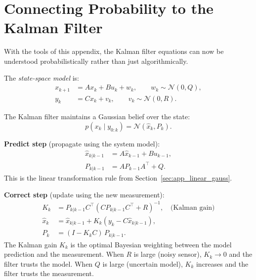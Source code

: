 \section{Connecting Probability to the Kalman Filter}
\label{sec:app_kalman_prob}

With the tools of this appendix, the Kalman filter equations can now
be understood probabilistically rather than just algorithmically.

The \emph{state-space model} is:
\begin{align*}
  {x}_{k+1} &= A{x}_k + B{u}_k + {w}_k,
  \qquad {w}_k \sim \mathcal{N}({0}, Q), \\
  {y}_k     &= C{x}_k + {v}_k,
  \qquad {v}_k \sim \mathcal{N}({0}, R).
\end{align*}

The Kalman filter maintains a Gaussian belief over the state:
\[
  p({x}_k \mid {y}_{0:k}) = \mathcal{N}(\hat{{x}}_k, P_k).
\]

\textbf{Predict step} (propagate using the system model):
\begin{align}
  \hat{{x}}_{k|k-1} &= A\hat{{x}}_{k-1} + B{u}_{k-1}, \\
  P_{k|k-1}                 &= A P_{k-1} A^\top + Q.
\end{align}
This is the linear transformation rule from
Section~\ref{sec:app_linear_gauss}.

\textbf{Correct step} (update using the new measurement):
\begin{align}
  K_k               &= P_{k|k-1} C^\top
                        (C P_{k|k-1} C^\top + R)^{-1},
                        \quad\text{(Kalman gain)} \\
  \hat{{x}}_k &= \hat{{x}}_{k|k-1}
                        + K_k({y}_k - C\hat{{x}}_{k|k-1}), \\
  P_k               &= (I - K_k C)\,P_{k|k-1}.
\end{align}
The Kalman gain $K_k$ is the optimal Bayesian weighting between the
model prediction and the measurement.  When $R$ is large (noisy
sensor), $K_k \to 0$ and the filter trusts the model.  When $Q$ is
large (uncertain model), $K_k$ increases and the filter trusts the
measurement.


